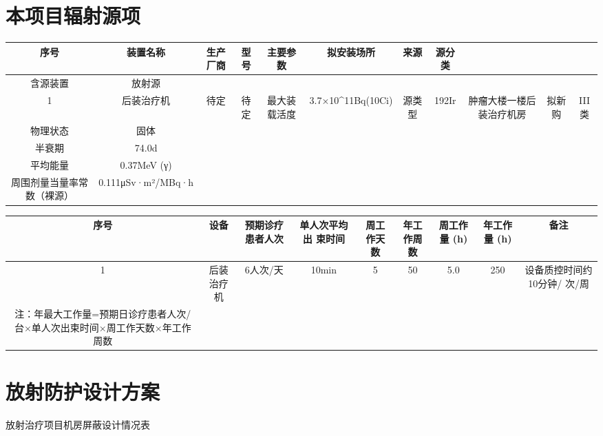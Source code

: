 \section{本项目辐射源项}

\begin{table}[H]
\centering
\begin{tabular}{|c|c|c|c|c|c|c|c|c|c|c|}
\hline
序号 & 装置名称 & 生产厂商 & 型号 & 主要参数 & 拟安装场所 & 来源 & 源分类 &  &  &  \\
\hline
含源装置 & 放射源 &  &  &  &  &  &  &  &  &  \\
\hline
1 & 后装治疗机 & 待定 & 待定 & 最大装载活度 & 3.7×10\textasciicircum{}11Bq(10Ci) & 源类型 & 192Ir & 肿瘤大楼一楼后装治疗机房 & 拟新购 & III类 \\
\hline
物理状态 & 固体 &  &  &  &  &  &  &  &  &  \\
\hline
半衰期 & 74.0d &  &  &  &  &  &  &  &  &  \\
\hline
平均能量 & 0.37MeV (γ) &  &  &  &  &  &  &  &  &  \\
\hline
周围剂量当量率常数（裸源） & 0.111μSv·m²/MBq·h &  &  &  &  &  &  &  &  &  \\
\hline
\end{tabular}
\end{table}


\begin{table}[H]
\centering
\begin{tabular}{|c|c|c|c|c|c|c|c|c|}
\hline
序号 & 设备 & 预期诊疗患者人次 & 单人次平均出 束时间 & 周工作天数 & 年工作周数 & 周工作量 (h) & 年工作量 (h) & 备注 \\
\hline
1 & 后装治疗机 & 6人次/天 & 10min & 5 & 50 & 5.0 & 250 & 设备质控时间约10分钟/ 次/周 \\
\hline
注：年最大工作量=预期日诊疗患者人次/台×单人次出束时间×周工作天数×年工作周数 &  &  &  &  &  &  &  &  \\
\hline
\end{tabular}
\end{table}


\section{放射防护设计方案}

放射治疗项目机房屏蔽设计情况表


